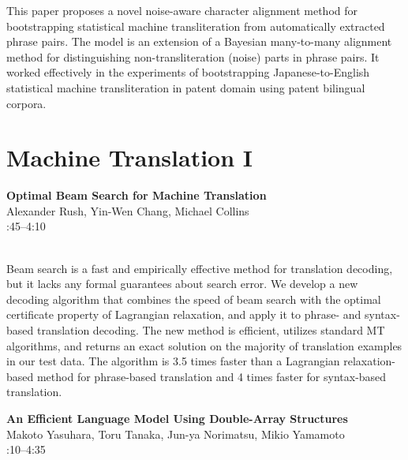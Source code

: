 \documentclass[twoside,makeidx]{book}
\renewcommand{\normalsize}{\fontsize{8}{9}\selectfont}
\renewcommand{\small}{\fontsize{7}{8}\selectfont}
\begin{document}
\nopagebreak%
\noindent%
{\small This paper proposes a novel noise-aware character alignment method for bootstrapping statistical machine transliteration from automatically extracted phrase pairs. The model is an extension of a Bayesian many-to-many alignment method for distinguishing non-transliteration (noise) parts in phrase pairs. It worked effectively in the experiments of bootstrapping Japanese-to-English statistical machine transliteration in patent domain using patent bilingual corpora.}
\clearpage
\section{Machine Translation I}
\vspace{-1em}
\par\vspace{2em}\noindent%
\begin{minipage}{\linewidth}%
\begin{center}
\textbf{\normalsize Optimal Beam Search for Machine Translation}\\
\normalsize  Alexander Rush,  Yin-Wen Chang,  Michael Collins\\
{\small 3:45--4:10}\\
\end{center}
\end{minipage}\\[0.5em]
\nopagebreak%
\noindent%
{\small Beam search is a fast and empirically effective method for translation decoding, but it lacks any formal guarantees about search error. We develop a new decoding algorithm that combines the speed of beam search with the optimal certificate property of Lagrangian relaxation, and apply it to phrase- and syntax-based translation decoding. The new method is efficient, utilizes standard MT algorithms, and returns an exact solution on the majority of translation examples in our test data. The algorithm is 3.5 times faster than a Lagrangian relaxation-based method for phrase-based translation and 4 times faster for syntax-based translation.}
\par\vspace{2em}\noindent%
\begin{minipage}{\linewidth}%
\begin{center}
\textbf{\normalsize An Efficient Language Model Using Double-Array Structures}\\
\normalsize  Makoto Yasuhara,  Toru Tanaka,  Jun-ya Norimatsu,  Mikio Yamamoto\\
{\small 4:10--4:35}\\
\end{center}
\end{minipage}\\[0.5em]
\end{document}
